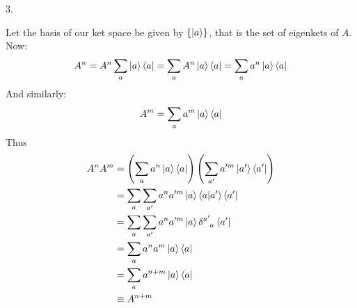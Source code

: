 \documentclass[a4paper,12pt]{article}
\begin{document}
3.
\begin{minipage}[t]{0.9\textwidth}
  \begin{minipage}[t]{\textwidth}
    Let the basis of our ket space be given by $\left\{\ket{a}\right\}$, that is the set of eigenkets of $A$.
    Now:
    \begin{equation*}
      A^n = A^n\sum_a \ket{a}\bra{a} = \sum_a A^n\ket{a}\bra{a} = \sum_a a^n\ket{a}\bra{a}
    \end{equation*}
    And similarly:
    \begin{equation*}
      A^m = \sum_a a^m\ket{a}\bra{a}
    \end{equation*}
    Thus
    \begin{align*}
      A^nA^m &= \left(\sum_a a^n\ket{a}\bra{a}\right)\left(\sum_{a'} a'^m\ket{a'}\bra{a'}\right)\\
             &= \sum_a \sum_{a'} a^na'^m\ket{a}\braket{a | a'}\bra{a'}\\
             &= \sum_a \sum_{a'} a^na'^m\ket{a}\tensor{\delta}{^{a'}_{a}}\bra{a'}\\
             &= \sum_a a^na^m\ket{a}\bra{a}\\
             &= \sum_a a^{n + m}\ket{a}\bra{a}\\
             &\equiv A^{n + m}
    \end{align*}
  \end{minipage}
\end{minipage}
\end{document}

